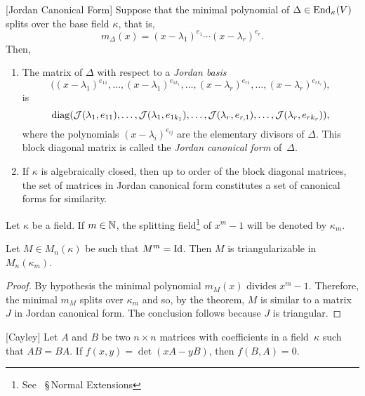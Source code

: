 \begin{thm} \label{thm:jordan-form}{\rm[Jordan Canonical Form]}
    Suppose that the minimal polynomial of\/ $\Delta \in {\operatorname{End}}_\kappa(V)$ splits over the base field\/ $\kappa$, that is,
    $$
        m_\Delta(x) = (x-\lambda_1)^{e_1}
            \cdots(x-\lambda_r)^{e_r}.
    $$
    Then,
    \begin{enumerate}[\rm a)]
        \item The matrix of\/ $\Delta$ with respect to a \textsl{Jordan basis}
        $$
            \big((x-\lambda_1)^{e_{11}},\dots,
            (x-\lambda_1)^{e_{1k_1}},\dots,
            (x-\lambda_r)^{e_{r1}},\dots,
            (x-\lambda_r)^{e_{rk_r}}\big),
        $$
        is
        $$
            \operatorname{diag}(\mathcal J(\lambda_1,e_{11}), 
                \dots,\mathcal J(\lambda_1,e_{1k_1}),
                \dots,\mathcal J(\lambda_r,e_{r,1}), \dots,\mathcal J(\lambda_r,e_{rk_r})),
        $$
        where the polynomials\/ $(x-\lambda_i)^{e_{ij}}$ are the elementary divisors of\/ $\Delta$. This block diagonal matrix is called the \textsl{Jordan canonical form} of~$\Delta$.

        \item If\/ $\kappa$ is algebraically closed, then up to order of the block diagonal matrices, the set of matrices in Jordan canonical form constitutes a set of canonical forms for similarity.
    \end{enumerate}
\end{thm}

\begin{ntn}
    Let\/ $\kappa$ be a field. If\/ $m\in\mathbb{N}$, the splitting field\/\footnote{See \citep{LC}~\S\,Normal Extensions} of\/ $x^m-1$ will be denoted by\/ $\kappa_m$.
\end{ntn}

\begin{cor}\label{cor:triangularizable-cyclotomic}
    Let $M\in M_n(\kappa)$ be such that $M^m=\operatorname{Id}$. Then $M$ is triangularizable in $M_n(\kappa_m)$.
\end{cor}

\begin{proof}
    By hypothesis the minimal polynomial $m_M(x)$ divides $x^m-1$. Therefore, the minimal $m_M$ splits over $\kappa_m$ and so, by the theorem, $M$ is similar to a matrix $J$ in Jordan canonical form. The conclusion follows because $J$ is triangular.
\end{proof}

\begin{thm}\label{thm:Cayley} {\rm [Cayley]}
    Let\/ $A$ and\/ $B$ be two\/ $n\times n$ matrices with coefficients in a field~$\kappa$ such that\/ $AB=BA$. If\/ $f(x,y)=\det(xA-yB)$, then\/ $f(B,A)=0$.
\end{thm}

